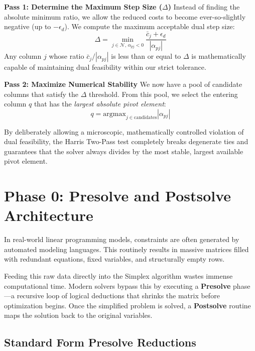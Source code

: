 \documentclass[11pt, a4paper]{article}
\begin{document}
\begin{algostep}
\textbf{Pass 1: Determine the Maximum Step Size ($\Delta$)}
Instead of finding the absolute minimum ratio, we allow the reduced costs to become ever-so-slightly negative (up to $-\epsilon_d$). We compute the maximum acceptable dual step size:
\[
\Delta = \min_{j \in \mathcal{N}, \, \alpha_{pj} < 0} \frac{\bar{c}_j + \epsilon_d}{|\alpha_{pj}|}
\]
Any column $j$ whose ratio $\bar{c}_j / |\alpha_{pj}|$ is less than or equal to $\Delta$ is mathematically capable of maintaining dual feasibility within our strict tolerance.

\textbf{Pass 2: Maximize Numerical Stability}
We now have a pool of candidate columns that satisfy the $\Delta$ threshold. From this pool, we select the entering column $q$ that has the \emph{largest absolute pivot element}:
\[
q = \text{argmax}_{j \in \text{candidates}} |\alpha_{pj}|
\]
\end{algostep}

By deliberately allowing a microscopic, mathematically controlled violation of dual feasibility, the Harris Two-Pass test completely breaks degenerate ties and guarantees that the solver always divides by the most stable, largest available pivot element.

\section{Phase 0: Presolve and Postsolve Architecture}

In real-world linear programming models, constraints are often generated by automated modeling languages. This routinely results in massive matrices filled with redundant equations, fixed variables, and structurally empty rows.

Feeding this raw data directly into the Simplex algorithm wastes immense computational time. Modern solvers bypass this by executing a \textbf{Presolve} phase---a recursive loop of logical deductions that shrinks the matrix before optimization begins. Once the simplified problem is solved, a \textbf{Postsolve} routine maps the solution back to the original variables.

\subsection{Standard Form Presolve Reductions}
\end{document}
